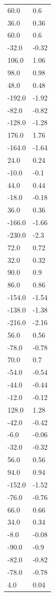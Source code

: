 \begin{longtable}{ll}
60.0 & 0.6 \\
36.0 & 0.36 \\
60.0 & 0.6 \\
-32.0 & -0.32 \\
106.0 & 1.06 \\
98.0 & 0.98 \\
48.0 & 0.48 \\
-192.0 & -1.92 \\
-82.0 & -0.82 \\
-128.0 & -1.28 \\
176.0 & 1.76 \\
-164.0 & -1.64 \\
24.0 & 0.24 \\
-10.0 & -0.1 \\
44.0 & 0.44 \\
-18.0 & -0.18 \\
36.0 & 0.36 \\
-166.0 & -1.66 \\
-230.0 & -2.3 \\
72.0 & 0.72 \\
32.0 & 0.32 \\
90.0 & 0.9 \\
86.0 & 0.86 \\
-154.0 & -1.54 \\
-138.0 & -1.38 \\
-216.0 & -2.16 \\
56.0 & 0.56 \\
-78.0 & -0.78 \\
70.0 & 0.7 \\
-54.0 & -0.54 \\
-44.0 & -0.44 \\
-12.0 & -0.12 \\
128.0 & 1.28 \\
-42.0 & -0.42 \\
-6.0 & -0.06 \\
-32.0 & -0.32 \\
56.0 & 0.56 \\
94.0 & 0.94 \\
-152.0 & -1.52 \\
-76.0 & -0.76 \\
66.0 & 0.66 \\
34.0 & 0.34 \\
-8.0 & -0.08 \\
-90.0 & -0.9 \\
-82.0 & -0.82 \\
-78.0 & -0.78 \\
4.0 & 0.04 \\

\end{longtable}
